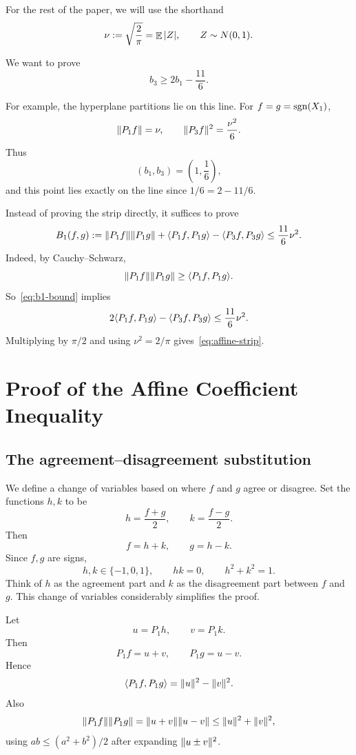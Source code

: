 For the rest of the paper, we will use the shorthand
\[
        \nu:=\sqrt{\frac{2}{\pi}}=\mathop{\mathbb{E}}|Z|,
        \qquad Z\sim N(0,1).
\]

We want to prove
\begin{equation}
        b_3\ge 2b_1-\frac{11}{6}.
        \label{eq:affine-strip}
\end{equation}

For example, the hyperplane partitions lie on this line. For $f=g=\operatorname{sgn}(X_1)$,
\[
        \lVert P_1f\rVert=\nu,
        \qquad
        \lVert P_3f\rVert^2=\frac{\nu^2}{6}.
\]
Thus
\[
        (b_1,b_3)=\left(1,\frac16\right),
\]
and this point lies exactly on the line since $1/6=2-11/6$.

Instead of proving the strip directly, it suffices to prove
\begin{equation}
        B_1(f,g)
        :=\lVert P_1f\rVert\lVert P_1g\rVert
          +\langle P_1f,P_1g\rangle
          -\langle P_3f,P_3g\rangle
        \le \frac{11}{6}\nu^2.
        \label{eq:b1-bound}
\end{equation}
Indeed, by Cauchy--Schwarz,
\[
        \lVert P_1f\rVert\lVert P_1g\rVert\ge \langle P_1f,P_1g\rangle.
\]
So~\eqref{eq:b1-bound} implies
\[
        2\langle P_1f,P_1g\rangle-\langle P_3f,P_3g\rangle\le \frac{11}{6}\nu^2.
\]
Multiplying by $\pi/2$ and using $\nu^2=2/\pi$ gives~\eqref{eq:affine-strip}.

\section{Proof of the Affine Coefficient Inequality}
\label{sec:affine-strip}

\subsection{The agreement--disagreement substitution}
\label{sec:agreement-disagreement}

We define a change of variables based on where $f$ and $g$ agree or disagree. Set the functions $h,k$ to be
\[
        h=\frac{f+g}{2},\qquad k=\frac{f-g}{2}.
\]
Then
\[
        f=h+k,
        \qquad
        g=h-k.
\]
Since $f,g$ are signs,
\[
        h,k\in\{-1,0,1\},
        \qquad
        hk=0,
        \qquad
        h^2+k^2=1.
\]
Think of $h$ as the agreement part and $k$ as the disagreement part between $f$ and $g$. This change of variables considerably simplifies the proof.

Let
\[
        u=P_1h,
        \qquad
        v=P_1k.
\]
Then
\[
        P_1f=u+v,
        \qquad
        P_1g=u-v.
\]
Hence
\[
        \langle P_1f,P_1g\rangle=\lVert u\rVert^2-\lVert v\rVert^2.
\]
Also
\[
        \lVert P_1f\rVert\lVert P_1g\rVert
        =\lVert u+v\rVert\lVert u-v\rVert
        \le \lVert u\rVert^2+\lVert v\rVert^2,
\]
using $ab\le(a^2+b^2)/2$ after expanding $\lVert u\pm v\rVert^2$.

